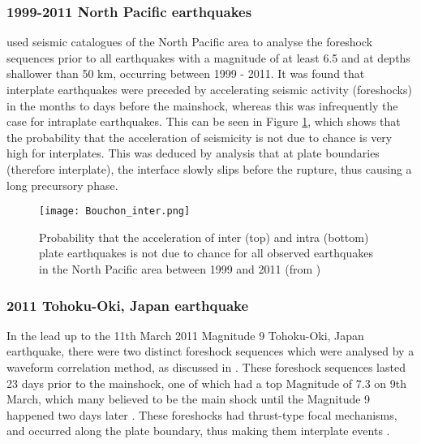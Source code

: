 \documentclass[12pt]{report}
\begin{document}

\subsubsection{1999-2011 North Pacific earthquakes}
\cite{Bouchon2013} used seismic catalogues of the North Pacific area to analyse the foreshock sequences prior to all earthquakes with a magnitude of at least 6.5 and at depths shallower than 50 km, occurring between 1999 - 2011. It was found that interplate earthquakes were preceded by accelerating seismic activity (foreshocks) in the months to days before the mainshock, whereas this was infrequently the case for intraplate earthquakes. This can be seen in Figure \ref{Bouchon_inter}, which shows that the probability that the acceleration of seismicity is not due to chance is very high for interplates. This was deduced by analysis that at plate boundaries (therefore interplate), the interface slowly slips before the rupture, thus causing a long precursory phase. 

\begin{figure}[h!]
	\begin{center}
		\texttt{[image: Bouchon\_inter.png]}
		\caption{Probability that the acceleration of inter (top) and intra (bottom) plate earthquakes is not due to chance for all observed earthquakes in the North Pacific area between 1999 and 2011 (from \cite{Bouchon2013})}
		\label{Bouchon_inter}
	\end{center}
\end{figure}

\FloatBarrier

\subsubsection{2011 Tohoku-Oki, Japan earthquake}
In the lead up to the 11th March 2011 Magnitude 9 Tohoku-Oki, Japan earthquake, there were two distinct foreshock sequences which were analysed by a waveform correlation method, as discussed in \cite{Kato2012}. These foreshock sequences lasted 23 days prior to the mainshock, one of which had a top Magnitude of 7.3 on 9th March, which many believed to be the main shock until the Magnitude 9 happened two days later \citep{Asano2011,Kato2012}. These foreshocks had thrust-type focal mechanisms, and occurred along the plate boundary, thus making them interplate events \citep{Asano2011}.
\end{document}
